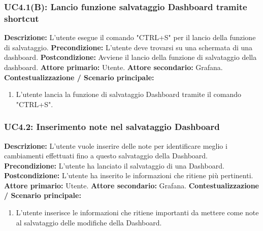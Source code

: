                 \subsubsection{UC4.1(B): Lancio funzione salvataggio Dashboard tramite shortcut}
                    \textbf{Descrizione:} L’utente esegue il comando "CTRL+S" per il lancio della funzione di salvataggio.
                    \newline
                    \textbf{Precondizione:} L'utente deve trovarsi su una schermata di una dashboard.
                    \newline
                    \textbf{Postcondizione:} Avviene il lancio della funzione di salvataggio della dashboard.
                    \newline
                    \textbf{Attore primario:} Utente.
                    \newline
                    \textbf{Attore secondario:} Grafana.
                    \newline
                    \textbf{Contestualizzazione / Scenario principale:} \begin{enumerate}
                        \item L'utente lancia la funzione di salvataggio Dashboard tramite il comando "CTRL+S".
                    \end{enumerate}
                
                \subsubsection{UC4.2: Inserimento note nel salvataggio Dashboard}
                    \textbf{Descrizione:} L’utente vuole inserire delle note per identificare meglio i cambiamenti effettuati fino a questo salvataggio della Dashboard.
                    \newline
                    \textbf{Precondizione:} L'utente ha lanciato il salvataggio di una Dashboard.
                    \newline
                    \textbf{Postcondizione:} L'utente ha inserito le informazioni che ritiene più pertinenti.
                    \newline
                    \textbf{Attore primario:} Utente.
                    \newline
                    \textbf{Attore secondario:} Grafana.
                    \newline
                    \textbf{Contestualizzazione / Scenario principale:} \begin{enumerate}
                        \item L'utente inserisce le informazioni che ritiene importanti da mettere come note al salvataggio delle modifiche della Dashboard.
                    \end{enumerate}
                
